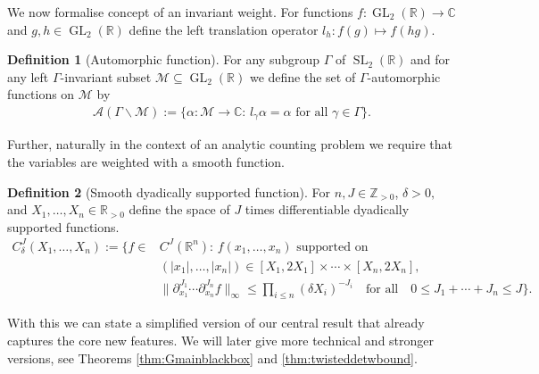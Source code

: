 \documentclass[12pt]{amsart}
\theoremstyle{definition}
\newtheorem{definition}{Definition}
\theoremstyle{remark}
\numberwithin{equation}{section}
\newcommand{\C}{{\mathbb C}}
\newcommand{\R}{{\mathbb R}}
\newcommand{\Z}{{\mathbb Z}}
\newcommand{\1}{{\mathbf 1}}
\newcommand{\SL}{\operatorname{SL}_2}
\newcommand{\GL}{\operatorname{GL}_2}
\begin{document}
We now formalise concept of an invariant weight. For functions $f:\GL(\R) \to \C$ and $g,h \in \GL(\R)$ define the left translation operator $l_h: f(g) \mapsto f(h g )$.
\begin{definition}[Automorphic function]\label{def:groupaction}
For any subgroup $\Gamma$ of $\SL(\R)$ and for any left $\Gamma$-invariant subset $\mathcal{M} \subseteq \GL(\R)$ we define the set of $\Gamma$-automorphic functions on $\mathcal{M}$ by
\begin{align*} 
    \mathcal{A}(\Gamma \backslash \mathcal{M}):= \{\alpha:\mathcal{M} \to \C: \, l_\gamma \alpha = \alpha \,\, \text{for all} \,\, \gamma \in \Gamma\}.
\end{align*}
\end{definition}
Further, naturally in the context of an analytic counting problem we require that the variables are weighted with a smooth function. 
\begin{definition}[Smooth dyadically supported function]\label{def:SandS}
  For $n,J \in \Z_{>0}$, $\delta > 0,$ and $X_1,\dots,X_n \in \R_{>0}$  define the space of $J$ times differentiable dyadically supported functions. 
\begin{align*}
    C_\delta^J (X_1,\dots,X_n) := \{f\in& C^J(\R^n): \, f(x_1,\dots,x_n) \,\, \text{supported on} \,  \\
    &(|x_1|,\dots,|x_n|) \in [X_1,2X_1] \times \cdots \times [X_n,2X_n], \\
    &  \|\partial_{x_1}^{J_1} \cdots \partial_{x_n}^{J_n} f\|_\infty \leq  \prod_{i \leq n} (\delta  X_i)^{-J_i} \quad \text{for all} \quad 0 \leq J_1+\cdots+J_n  \leq J  \}.
\end{align*}
\end{definition}
With this we can state a simplified version of our central result that already captures the core new features. We will later give more technical and stronger versions, see Theorems  \ref{thm:Gmainblackbox} and \ref{thm:twisteddetwbound}. 
\end{document}
